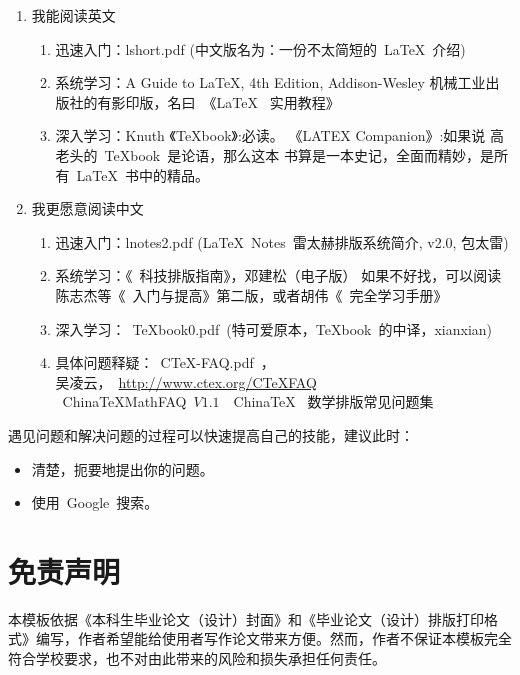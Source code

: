 \begin{enumerate}
\item 我能阅读英文
\begin{enumerate}
\item 迅速入门：lshort.pdf (中文版名为：一份不太简短的~\LaTeX{}~介绍)
\item 系统学习：A Guide to LaTeX, 4th Edition, Addison-Wesley
                机械工业出版社的有影印版，名曰~《\LaTeX{}~ 实用教程》
\item 深入学习：Knuth 《TeXbook》:必读。 《LATEX Companion》:如果说 高老头的~TeXbook~是论语，那么这本
               书算是一本史记，全面而精妙，是所有~\LaTeX~书中的精品。
\end{enumerate}

\item 我更愿意阅读中文
\begin{enumerate}
\item 迅速入门：lnotes2.pdf (\LaTeX~Notes~雷太赫排版系统简介, v2.0, 包太雷)
\item 系统学习：《\LaTeXe{}~科技排版指南》，邓建松（电子版）
      如果不好找，可以阅读陈志杰等《\LaTeXe~入门与提高》第二版，或者胡伟《\LaTeXe~完全学习手册》
\item 深入学习：~TeXbook0.pdf~(特可爱原本，TeXbook~的中译，xianxian)
\item 具体问题释疑：~CTeX-FAQ.pdf~，\\
        吴凌云，~\url{http://www.ctex.org/CTeXFAQ}~\\
      ~ChinaTeXMathFAQ~$V1.1$~~China\TeX~ 数学排版常见问题集
\end{enumerate}
\end{enumerate}

遇见问题和解决问题的过程可以快速提高自己的技能，建议此时：
\begin{itemize}
 \item 清楚，扼要地提出你的问题。
 \item 使用~Google~搜索。
\end{itemize}

\section{免责声明}

本模板依据《本科生毕业论文（设计）封面》和《毕业论文（设计）排版打印格式》编写，作者希望能给使用者写作论文带来方便。然而，作者不保证本模板完全符合学校要求，也不对由此带来的风险和损失承担任何责任。
